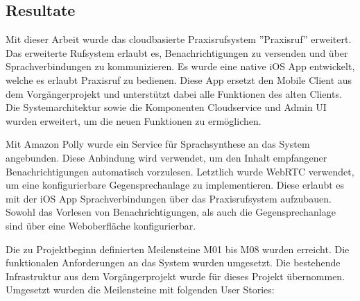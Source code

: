 \subsection{Resultate}

Mit dieser Arbeit wurde das cloudbasierte Praxisrufsystem ''Praxisruf'' erweitert.
Das erweiterte Rufsystem erlaubt es, Benachrichtigungen zu versenden und über Sprachverbindungen zu kommunizieren.
Es wurde eine native iOS App entwickelt, welche es erlaubt Praxisruf zu bedienen.
Diese App ersetzt den Mobile Client aus dem Vorgängerprojekt und unterstützt dabei alle Funktionen des alten Clients.
Die Systemarchitektur sowie die Komponenten Cloudservice und Admin UI wurden erweitert, um die neuen Funktionen zu ermöglichen.

Mit Amazon Polly wurde ein Service für Sprachsynthese an das System angebunden.
Diese Anbindung wird verwendet, um den Inhalt empfangener Benachrichtigungen automatisch vorzulesen.
Letztlich wurde WebRTC verwendet, um eine konfigurierbare Gegensprechanlage zu implementieren.
Diese erlaubt es mit der iOS App Sprachverbindungen über das Praxisrufsystem aufzubauen.
Sowohl das Vorlesen von Benachrichtigungen, als auch die Gegensprechanlage sind über eine Weboberfläche konfigurierbar.

Die zu Projektbeginn definierten Meilensteine M01 bis M08 wurden erreicht.
Die funktionalen Anforderungen an das System wurden umgesetzt.
Die bestehende Infrastruktur aus dem Vorgängerprojekt wurde für dieses Projekt übernommen.
Umgesetzt wurden die Meilensteine mit folgenden User Stories:

